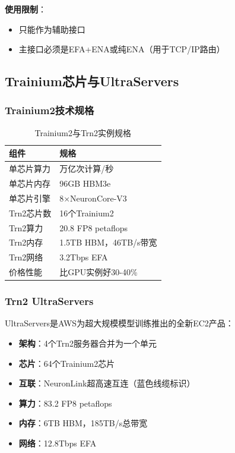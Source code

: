 \textbf{使用限制}：
\begin{itemize}
    \item 只能作为辅助接口
    \item 主接口必须是EFA+ENA或纯ENA（用于TCP/IP路由）
\end{itemize}

\subsection{Trainium芯片与UltraServers}

\subsubsection{Trainium2技术规格}

\begin{table}[htbp]
\centering
\caption{Trainium2与Trn2实例规格}
\begin{tabular}{@{}ll@{}}
\toprule
\textbf{组件} & \textbf{规格} \\
\midrule
单芯片算力 & 万亿次计算/秒 \\
单芯片内存 & 96GB HBM3e \\
单芯片引擎 & 8×NeuronCore-V3 \\
Trn2芯片数 & 16个Trainium2 \\
Trn2算力 & 20.8 FP8 petaflops \\
Trn2内存 & 1.5TB HBM，46TB/s带宽 \\
Trn2网络 & 3.2Tbps EFA \\
价格性能 & 比GPU实例好30-40\% \\
\bottomrule
\end{tabular}
\end{table}

\subsubsection{Trn2 UltraServers}

UltraServers是AWS为超大规模模型训练推出的全新EC2产品：

\begin{itemize}
    \item \textbf{架构}：4个Trn2服务器合并为一个单元
    \item \textbf{芯片}：64个Trainium2芯片
    \item \textbf{互联}：NeuronLink超高速互连（蓝色线缆标识）
    \item \textbf{算力}：83.2 FP8 petaflops
    \item \textbf{内存}：6TB HBM，185TB/s总带宽
    \item \textbf{网络}：12.8Tbps EFA
\end{itemize}

